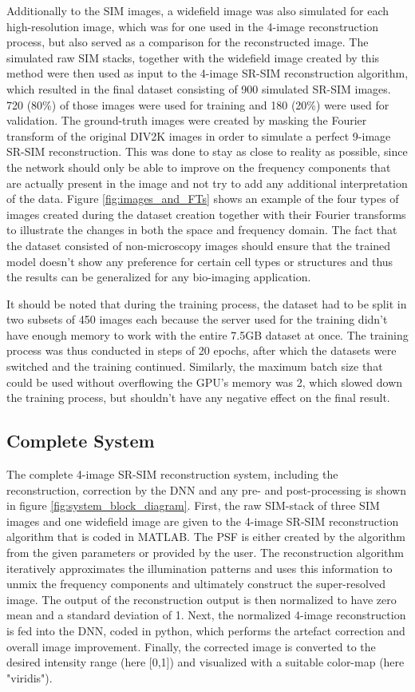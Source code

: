 \documentclass[conference]{IEEEtran}
\begin{document}
Additionally to the SIM images, a widefield image was also simulated for each high-resolution image, which was for one used in the 4-image reconstruction process, but also served as a comparison for the reconstructed image. The simulated raw SIM stacks, together with the widefield image created by this method were then used as input to the 4-image SR-SIM reconstruction algorithm, which resulted in the final dataset consisting of 900 simulated SR-SIM images. 720 (80\%) of those images were used for training and 180 (20\%) were used for validation. The ground-truth images were created by masking the Fourier transform of the original DIV2K images in order to simulate a perfect 9-image SR-SIM reconstruction. This was done to stay as close to reality as possible, since the network should only be able to improve on the frequency components that are actually present in the image and not try to add any additional interpretation of the data. Figure \ref{fig:images_and_FTs} shows an example of the four types of images created during the dataset creation together with their Fourier transforms to illustrate the changes in both the space and frequency domain. The fact that the dataset consisted of non-microscopy images should ensure that the trained model doesn't show any preference for certain cell types or structures and thus the results can be generalized for any bio-imaging application.

It should be noted that during the training process, the dataset had to be split in two subsets of 450 images each because the server used for the training didn't have enough memory to work with the entire 7.5GB dataset at once. The training process was thus conducted in steps of 20 epochs, after which the datasets were switched and the training continued. Similarly, the maximum batch size that could be used without overflowing the GPU's memory was 2, which slowed down the training process, but shouldn't have any negative effect on the final result.

\subsection{Complete System}

The complete 4-image SR-SIM reconstruction system, including the reconstruction, correction by the DNN and any pre- and post-processing is shown in figure \ref{fig:system_block_diagram}. First, the raw SIM-stack of three SIM images and one widefield image are given to the 4-image SR-SIM reconstruction algorithm that is coded in MATLAB. The PSF is either created by the algorithm from the given parameters or provided by the user. The reconstruction algorithm iteratively approximates the illumination patterns and uses this information to unmix the frequency components and ultimately construct the super-resolved image. The output of the reconstruction output is then normalized to have zero mean and a standard deviation of 1. Next, the normalized 4-image reconstruction is fed into the DNN, coded in python, which performs the artefact correction and overall image improvement. Finally, the corrected image is converted to the desired intensity range (here [0,1]) and visualized with a suitable color-map (here "viridis").
\end{document}
